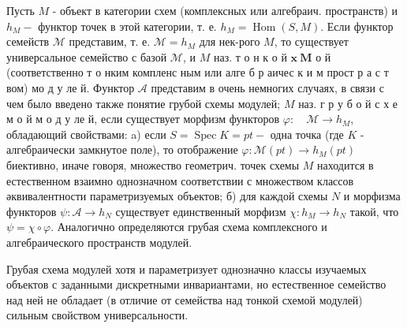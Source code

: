 \documentclass[10pt]{article}
\begin{document}
Пусть $M$ - объект в категории схем (комплексных или алгебраич. пространств) и $h_{M}-$ функтор точек в этой категории, т. е. $h_{M}=\operatorname{Hom}(S, M)$. Если функтор семейств $\mathscr{M}$ представим, т. е. $\mathscr{M}=h_{M}$ для нек-рого $M$, то существует универсальное семейство с базой $\mathscr{M}$, и $M$ наз. т о н к о й $\mathbf{x} \mathbf{~} \mathbf{M}$ о й (соответственно т о нким компленс ным или алге б р аичес к и м прост р а с т вом) мо д у ле й. Функтор $\mathscr{A}$ представим в очень немногих случаях, в связи с чем было введено также понятие грубой схемы модулей; $M$ наз. г р у б о й с х е м о й м о д у ле й, если существует морфизм функторов $\varphi: \quad \mathcal{M} \rightarrow h_{M}$, обладающий свойствами: a) если $S=\operatorname{Spec} K=p t-$ одна точка (где $K$ - алгебраически замкнутое поле), то отображение $\varphi: \mathscr{M}(p t) \rightarrow h_{M}(p t)$ биективно, иначе говоря, множество геометрич. точек схемы $M$ находится в естественном взаимно однозначном соответствии с множеством классов әквивалентности параметризуемых объектов; б) для каждой схемы $N$ и морфизма функторов $\psi: \mathscr{A} \rightarrow h_{N}$ существует единственный морфизм $\chi: h_{M} \rightarrow h_{N}$ такой, что $\psi=\chi \circ \varphi$. Аналогично определяются грубая схема комплексного и алгебраического пространств модулей.



Грубая схема модулей хотя и параметризует однозначно классы изучаемых объектов с заданными дискретными инвариантами, но естественное семейство над ней не обладает (в отличие от семейства над тонкой схемой модулей) сильным свойством универсальности.
\end{document}
